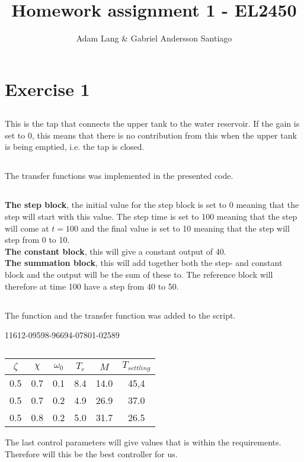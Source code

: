 \documentclass[12pt,a4paper]{article}
\title{Homework assignment 1 - EL2450}
\author{Adam Lang & Gabriel Andersson Santiago}
\begin{document}
\maketitle

\section{Exercise 1}
  
  \subsection{}%
  This is the tap that connects the upper tank to the water reservoir.
  If the gain is set to 0, this means that there is no contribution from
  this when the upper tank is being emptied, i.e. the tap is closed.
  
  \subsection{}%
  The transfer functions was implemented in the presented code.
  
  \subsection{}%
  \textbf{The step block}, the initial value for the step block is set to 
  0 meaning that the step will start with this value. The step time is
  set to 100 meaning that the step will come at $t=100$ and the final
  value is set to 10 meaning that the step will step from 0 to 10.\\
  \textbf{The constant block}, this will give a constant output of 40.\\
  \textbf{The summation block}, this will add together both the step-
  and constant block and the output will be the sum of these to. The
  reference block will therefore at time 100 have a step from 40 to 50.
  
  \subsection{}%
  The function and the transfer function was added to the script.

  11612-09598-96694-07801-02589\subsection{}%
  \begin{center}
    \begin{tabular}{|c | c | c | c | c | c |}
      \hline
      $\zeta$ & $\chi$ & $\omega_0$ & $T_r$ & $M$ & $T_{settling}$ \\
      \hline
      0.5 & 0.7 & 0.1 & 8.4 & 14.0 & 45,4 \\ 
      0.5 & 0.7 & 0.2 & 4.9 & 26.9 & 37.0 \\ 
      0.5 & 0.8 & 0.2 & 5.0 & 31.7 & 26.5 \\ \hline
    \end{tabular}
  \end{center}
  The last control parameters will give values that is within the
  requirements. Therefore will this be the best controller for us. 
\end{document}

